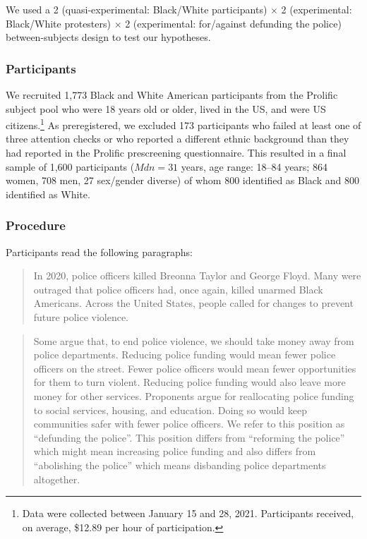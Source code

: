 \documentclass[twocolumn, 11pt, letterpaper]{article}
\begin{document}
We used a 2 (quasi-experimental: Black/White participants) \(\times\) 2
(experimental: Black/White protesters) \(\times\) 2 (experimental:
for/against defunding the police) between-subjects design to test our
hypotheses.

\hypertarget{participants-1}{%
\subsubsection{Participants}\label{participants-1}}

We recruited 1,773 Black and White American participants from the
Prolific subject pool who were 18 years old or older, lived in the US,
and were US citizens.\footnote{Data were collected between January 15
  and 28, 2021. Participants received, on average, \$12.89 per hour of
  participation.} As preregistered, we excluded 173 participants who
failed at least one of three attention checks or who reported a
different ethnic background than they had reported in the Prolific
prescreening questionnaire. This resulted in a final sample of 1,600
participants (\(\textit{Mdn} = 31\) years, age range: 18--84 years; 864
women, 708 men, 27 sex/gender diverse) of whom 800 identified as Black
and 800 identified as White.

\hypertarget{procedure-1}{%
\subsubsection{Procedure}\label{procedure-1}}

Participants read the following paragraphs:

\begin{quote}
In 2020, police officers killed Breonna Taylor and George Floyd. Many
were outraged that police officers had, once again, killed unarmed Black
Americans. Across the United States, people called for changes to
prevent future police violence.
\end{quote}

\begin{quote}
Some argue that, to end police violence, we should take money away from
police departments. Reducing police funding would mean fewer police
officers on the street. Fewer police officers would mean fewer
opportunities for them to turn violent. Reducing police funding would
also leave more money for other services. Proponents argue for
reallocating police funding to social services, housing, and education.
Doing so would keep communities safer with fewer police officers. We
refer to this position as ``defunding the police''. This position
differs from ``reforming the police'' which might mean increasing police
funding and also differs from ``abolishing the police'' which means
disbanding police departments altogether.
\end{quote}
\end{document}
